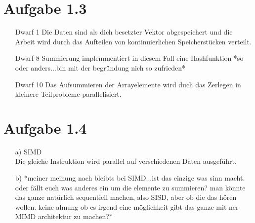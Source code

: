 \documentclass[a4paper,
               12pt,
               titlepage,
               BCOR12mm,
               ]{scrartcl}
\begin{document}
  
  \section*{Aufgabe 1.3}

    \begin{itemize}
      \item [Dwarf 1] Die Daten sind als dich besetzter Vektor abgespeichert und die Arbeit wird durch das Aufteilen von kontinuierlichen Speicherstücken verteilt.
      \item [Dwarf 8] Summierung implemmentiert in diesem Fall eine Hashfunktion *so oder anders...bin mit der begründung nich so zufrieden*
      \item [Dwarf 10] Das Aufsummieren der Arrayelemente wird duch das Zerlegen in kleinere Teilprobleme parallelisiert.
    \end{itemize}

  \section*{Aufgabe 1.4}

    \begin{itemize}
      \item [a)] SIMD \\ Die gleiche Instruktion wird parallel auf verschiedenen Daten ausgeführt.
      \item [b)] *meiner meinung nach bleibts bei SIMD...ist das einzige was sinn macht. oder fällt euch was anderes ein um die elemente zu summieren? man könnte das ganze natürlich sequentiell machen, also SISD, aber ob die das hören wollen. keine ahnung ob es irgend eine möglichkeit gibt das ganze mit ner MIMD architektur zu machen?*
    \end{itemize}
\end{document}
